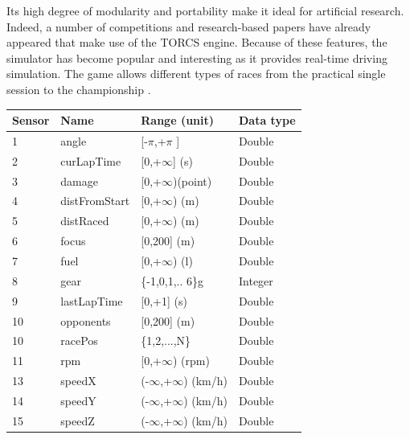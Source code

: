 \documentclass[runningheads,a4paper]{llncs}
\begin{document}
Its high degree of modularity and portability make it ideal for artificial research. Indeed, a number of competitions and research-based papers have already appeared that make use of the TORCS \cite{11} engine. Because of these features, the simulator has become popular and interesting as it provides real-time driving simulation. \cite{24} The game allows different types of races from the practical single session to the championship \cite{10}.

	\begin{table}[ht!]
		{\scriptsize
			{\centering
				\begin{tabular}{|p{2cm}|p{3cm}|p{3 cm}|p{3 cm}|}
					\hline
					{\textbf{Sensor} }&
					{\textbf{Name} }&
					{\textbf{Range} (unit)} &  
					{\textbf{Data type}}\\ 
					\hline
					1 & angle & [-$\pi$,+$\pi$ ] & Double\\ 
					\hline
					2 & curLapTime & [0,+$\infty$] (s)	& Double\\ 
					\hline 
					3 & damage & [0,+$\infty$)(point)& Double\\ 
					\hline 
					4 & distFromStart & [0,+$\infty$) (m)& Double \\ 
					\hline 
					5 & distRaced &[0,+$\infty$) (m)& Double\\
					\hline 
					
					6 & focus & [0,200] (m)& Double\\
					\hline 
					
					7 & fuel & [0,+$\infty$) (l)& Double\\
					
					\hline
					8 & gear & \{-1,0,1,.. 6\}g& Integer \\
					
					\hline
					9 & lastLapTime &[0,+1] (s) & Double \\
					
					\hline
					10 & opponents &[0,200] (m)& Double \\
					
					\hline
					10 & racePos & \{1,2,...,N\} & Double \\
					\hline
					11 & rpm    & [0,+$\infty$) (rpm)   & Double \\
					\hline  
					13 & speedX & (-$\infty$,+$\infty$) (km/h) & Double\\
					\hline  
					14 & speedY &(-$\infty$,+$\infty$) (km/h)  & Double\\
					\hline 
					15 & speedZ & (-$\infty$,+$\infty$) (km/h) & Double \\
					

\end{tabular}}}
\end{table}
\end{document}
